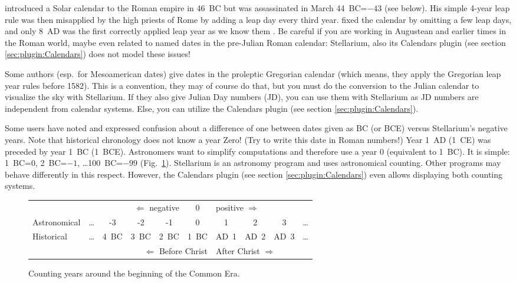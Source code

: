  introduced a Solar calendar to the Roman empire
in 46~BC but was assassinated in March 44~BC=$-43$ (see below).  His
simple 4-year leap rule was then misapplied by the high priests of
Rome by adding a leap day every third year.   fixed the
calendar by omitting a few leap days, and only 8~AD was the first
correctly applied leap year as we know them \citep[\S186,
  \S189]{Ginzel:ChronologieII}. Be careful if you are working in
Augustean and earlier times in the Roman world, maybe even related to
named dates in the pre-Julian Roman calendar: Stellarium, also its
Calendars plugin (see section \ref{sec:plugin:Calendars}) does not
model these issues!


Some authors (esp.\ for Mesoamerican dates) give dates in the
proleptic Gregorian calendar (which means, they apply the Gregorian
leap year rules before 1582). This is a convention, they may of course
do that, but you must do the conversion to the Julian calendar to
visualize the sky with Stellarium.  If they also give Julian Day
numbers (JD), you can use them with Stellarium as JD numbers are
independent from calendar systems. Else, you can utilize the Calendars
plugin (see section \ref{sec:plugin:Calendars}).

Some users have noted and expressed confusion about a difference of one between dates given as BC (or BCE) versus
Stellarium's negative years.  Note that historical chronology does not
know a year Zero! (Try to write this date in Roman numbers!)  Year
1~AD (1~CE) was preceded by year 1~BC (1~BCE). Astronomers want to simplify
computations and therefore use a year $0$ (equivalent to 1~BC). It is
simple: 1~BC=$0$, 2~BC=$-1$, \ldots 100~BC=$-99$ (Fig.~\ref{fig:Accuracy:Calendar}).  Stellarium is an
astronomy program and uses astronomical counting. Other programs may behave differently in this respect. However, the
Calendars plugin (see section \ref{sec:plugin:Calendars}) even allows
displaying both counting systems.

\begin{figure}[htb]\centering\small
  \begin{tabular}{l|ccccccccc}
    & \multicolumn{4}{r}{$\Longleftarrow$ negative}&
    \multicolumn{1}{c}{0}&
    \multicolumn{4}{l}{positive $\Longrightarrow$}\\
    Astronomical & \ldots & -3   & -2   & -1   & 0                        & 1    & 2    & 3    & \ldots\\\hline
    Historical   & \ldots & 4~BC & 3~BC & 2~BC &\multicolumn{1}{c||}{1~BC}& AD~1 & AD~2 & AD~3 & \ldots\\
    & \multicolumn{5}{r||}{$\Longleftarrow$ Before Christ}&
      \multicolumn{4}{l}{After Christ $\Longrightarrow$}
  \end{tabular}
  \caption{Counting years around the beginning of the Common Era.}
  \label{fig:Accuracy:Calendar}
\end{figure}
  

